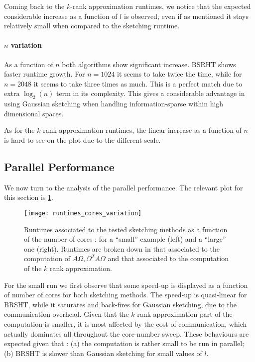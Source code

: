 \documentclass[a4paper, 12pt,oneside]{article}
\begin{document}
		Coming back to the $k$-rank approximation runtimes, we notice that the expected considerable increase as a function of $l$ is observed, even if as mentioned it stays relatively small when compared to the sketching runtime.
		\paragraph{$n$ variation}
		As a function of $n$ both algorithms show significant increase. BSRHT shows faster runtime growth. For $n=1024$ it seems to take twice the time, while for $n=2048$ it seems to take three times as much. This is a perfect match due to extra $\log_2(n)$ term in its complexity. This gives a considerable advantage in using Gaussian sketching when handling information-sparse within high dimensional spaces.

		As for the $k$-rank approximation runtimes, the linear increase as a function of $n$ is hard to see on the plot due to the different scale. 
        \subsection{Parallel Performance}
			We now turn to the analysis of the parallel performance. The relevant plot for this section is \ref{fig:runtimes-cores-variation}. 
			\begin{figure}[htb]       
				\centering             
					\vspace{0em}
					\texttt{[image: runtimes\_cores\_variation]}
					\caption{Runtimes associated to the tested sketching methods as a function of the number of cores : for a ``small'' example (left) and a ``large'' one (right). Runtimes are broken down in that associated to the computation of $A\Omega,\Omega^T A\Omega$ and that associated to the computation of the $k$ rank approximation.}
					\label{fig:runtimes-cores-variation}
			\end{figure}
			For the small run we first observe that some speed-up is displayed as a function of number of cores for both sketching methods. The speed-up is quasi-linear for BRSHT, while it saturates and back-fires for Gaussian sketching, due to the communication overhead. Given that the $k$-rank approximation part of the computation is smaller, it is most affected by the cost of communication, which actually dominates all throughout the core-number sweep.   
			These behaviours are expected given that : (a) the computation is rather small to be run in parallel; (b) BRSHT is slower than Gaussian sketching for small values of $l$. 
			
\end{document}
